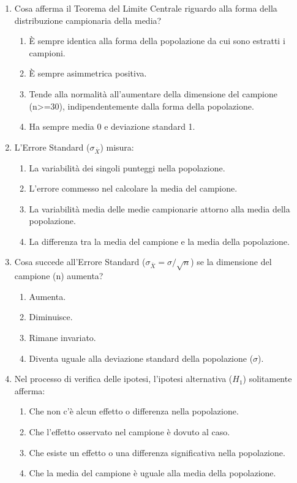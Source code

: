 \documentclass[12pt, a4paper]{article}
\begin{document}
\begin{enumerate}
    \item Cosa afferma il Teorema del Limite Centrale riguardo alla forma della distribuzione campionaria della media?
    \begin{enumerate}
        \item È sempre identica alla forma della popolazione da cui sono estratti i campioni.
        \item È sempre asimmetrica positiva.
        \item Tende alla normalità all'aumentare della dimensione del campione (n>=30), indipendentemente dalla forma della popolazione.
        \item Ha sempre media 0 e deviazione standard 1.
    \end{enumerate}

    \item L'Errore Standard ($\sigma_{\bar{X}}$) misura:
    \begin{enumerate}
        \item La variabilità dei singoli punteggi nella popolazione.
        \item L'errore commesso nel calcolare la media del campione.
        \item La variabilità media delle medie campionarie attorno alla media della popolazione.
        \item La differenza tra la media del campione e la media della popolazione.
    \end{enumerate}

    \item Cosa succede all'Errore Standard ($\sigma_{\bar{X}} = \sigma / \sqrt{n}$) se la dimensione del campione (n) aumenta?
    \begin{enumerate}
        \item Aumenta.
        \item Diminuisce.
        \item Rimane invariato.
        \item Diventa uguale alla deviazione standard della popolazione ($\sigma$).
    \end{enumerate}

    \item Nel processo di verifica delle ipotesi, l'ipotesi alternativa ($H_1$) solitamente afferma:
    \begin{enumerate}
        \item Che non c'è alcun effetto o differenza nella popolazione.
        \item Che l'effetto osservato nel campione è dovuto al caso.
        \item Che esiste un effetto o una differenza significativa nella popolazione.
        \item Che la media del campione è uguale alla media della popolazione.
    \end{enumerate}


\end{enumerate}
\end{document}
